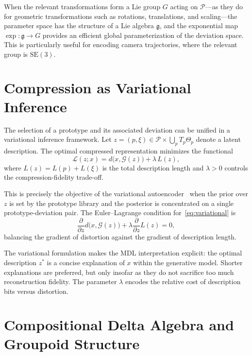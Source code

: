 \documentclass[12pt,a4paper]{article}
\theoremstyle{definition}
\theoremstyle{remark}
\begin{document}
When the relevant transformations form a Lie group $G$ acting on $\mathcal{P}$---as they do for geometric transformations such as rotations, translations, and scaling---the parameter space has the structure of a Lie algebra $\mathfrak{g}$, and the exponential map $\exp : \mathfrak{g} \rightarrow G$ provides an efficient global parameterization of the deviation space. This is particularly useful for encoding camera trajectories, where the relevant group is $\mathrm{SE}(3)$.

\section{Compression as Variational Inference}
\label{sec:variational}

The selection of a prototype and its associated deviation can be unified in a variational inference framework. Let $z = (p, \xi) \in \mathcal{P} \times \bigcup_{p} T_p\Theta_p$ denote a latent description. The optimal compressed representation minimizes the functional
\begin{equation}
\mathcal{L}(z; x) = d\big(x, \mathcal{G}(z)\big) + \lambda \, L(z),
\label{eq:variational}
\end{equation}
where $L(z) = L(p) + L(\xi)$ is the total description length and $\lambda > 0$ controls the compression-fidelity trade-off.

This is precisely the objective of the variational autoencoder~\cite{vqvae} when the prior over $z$ is set by the prototype library and the posterior is concentrated on a single prototype-deviation pair. The Euler--Lagrange condition for~\eqref{eq:variational} is
\[
\frac{\partial}{\partial z} d\big(x, \mathcal{G}(z)\big) + \lambda \frac{\partial}{\partial z} L(z) = 0,
\]
balancing the gradient of distortion against the gradient of description length.

The variational formulation makes the MDL interpretation explicit: the optimal description $z^*$ is a concise explanation of $x$ within the generative model. Shorter explanations are preferred, but only insofar as they do not sacrifice too much reconstruction fidelity. The parameter $\lambda$ encodes the relative cost of description bits versus distortion.

\section{Compositional Delta Algebra and Groupoid Structure}
\label{sec:groupoid}
\end{document}

